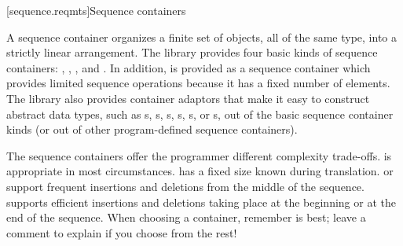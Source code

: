 [sequence.reqmts]{Sequence containers}

\pnum
A sequence container organizes a finite set of objects, all of the same type, into a strictly
linear arrangement. The library provides four basic kinds of sequence containers:
, , , and . In addition,
 is provided as a sequence container which provides limited sequence operations
because it has a fixed number of elements. The library also provides container adaptors that
make it easy to construct abstract data types,
such as s,
s,
s,
s,
s, or
s, out of
the basic sequence container kinds (or out of other program-defined sequence containers).

\pnum
\begin{note}
The sequence containers
offer the programmer different complexity trade-offs.
is appropriate in most circumstances.
has a fixed size known during translation.
 or 
support frequent insertions and deletions from the
middle of the sequence.
supports efficient insertions and deletions taking place at the beginning or at the
end of the sequence.
When choosing a container, remember  is best;
leave a comment to explain if you choose from the rest!
\end{note}

